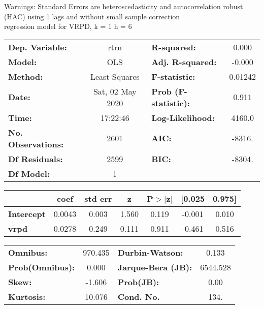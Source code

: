 Warnings: \newline
 [1] Standard Errors are heteroscedasticity and autocorrelation robust (HAC) using 1 lags and without small sample correction\\ 

regression model for VRPD, k = 1 h = 6\begin{center}
\begin{tabular}{lclc}
\toprule
\textbf{Dep. Variable:}    &       rtrn       & \textbf{  R-squared:         } &     0.000   \\
\textbf{Model:}            &       OLS        & \textbf{  Adj. R-squared:    } &    -0.000   \\
\textbf{Method:}           &  Least Squares   & \textbf{  F-statistic:       } &   0.01242   \\
\textbf{Date:}             & Sat, 02 May 2020 & \textbf{  Prob (F-statistic):} &    0.911    \\
\textbf{Time:}             &     17:22:46     & \textbf{  Log-Likelihood:    } &    4160.0   \\
\textbf{No. Observations:} &        2601      & \textbf{  AIC:               } &    -8316.   \\
\textbf{Df Residuals:}     &        2599      & \textbf{  BIC:               } &    -8304.   \\
\textbf{Df Model:}         &           1      & \textbf{                     } &             \\
\bottomrule
\end{tabular}
\begin{tabular}{lcccccc}
                   & \textbf{coef} & \textbf{std err} & \textbf{z} & \textbf{P$> |$z$|$} & \textbf{[0.025} & \textbf{0.975]}  \\
\midrule
\textbf{Intercept} &       0.0043  &        0.003     &     1.560  &         0.119        &       -0.001    &        0.010     \\
\textbf{vrpd}      &       0.0278  &        0.249     &     0.111  &         0.911        &       -0.461    &        0.516     \\
\bottomrule
\end{tabular}
\begin{tabular}{lclc}
\textbf{Omnibus:}       & 970.435 & \textbf{  Durbin-Watson:     } &    0.133  \\
\textbf{Prob(Omnibus):} &   0.000 & \textbf{  Jarque-Bera (JB):  } & 6544.528  \\
\textbf{Skew:}          &  -1.606 & \textbf{  Prob(JB):          } &     0.00  \\
\textbf{Kurtosis:}      &  10.076 & \textbf{  Cond. No.          } &     134.  \\
\bottomrule
\end{tabular}
\end{center}

